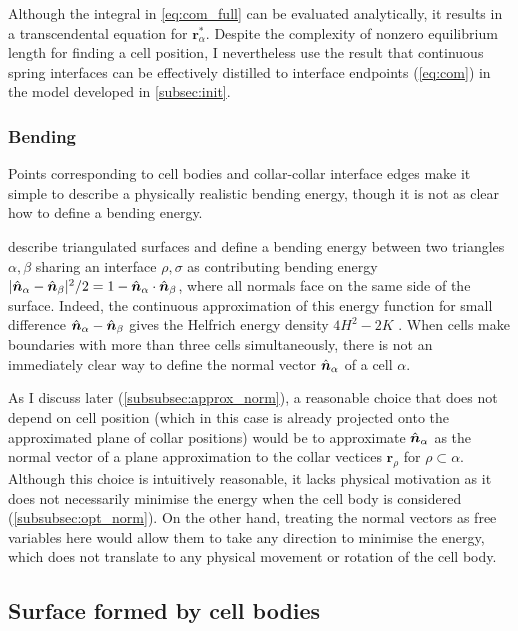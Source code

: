 Although the integral in \cref{eq:com_full} can be evaluated analytically, it results in a transcendental equation for $\bm{r}_\alpha^*$. 
Despite the complexity of nonzero equilibrium length for finding a cell position, I nevertheless use the result that continuous spring interfaces can be effectively distilled to interface endpoints (\cref{eq:com}) in the model developed in \cref{subsec:init}.

\subsubsection{Bending} \label{subsubsec:bending}

Points corresponding to cell bodies and collar-collar interface edges make it simple to describe a physically realistic bending energy, though it is not as clear how to define a bending energy.

\citet{seung1988} describe triangulated surfaces and define a bending energy between two triangles $\alpha,\beta$ sharing an interface $\rho, \sigma$ as contributing bending energy $|\hat{\bm{n}}_\alpha - \hat{\bm{n}}_\beta|^2/2 = 1 - \hat{\bm{n}}_\alpha \cdot \hat{\bm{n}}_\beta$, where all normals face on the same side of the surface. 
Indeed, the continuous approximation of this energy function for small difference $\hat{\bm{n}}_\alpha - \hat{\bm{n}}_\beta$ gives the Helfrich energy density $4H^2 - 2K$ \citep{helfrich1973}. 
When cells make boundaries with more than three cells simultaneously, there is not an immediately clear way to define the normal vector $\hat{\bm{n}}_\alpha$ of a cell $\alpha$. 

As I discuss later (\cref{subsubsec:approx_norm}), a reasonable choice that does not depend on cell position (which in this case is already projected onto the approximated plane of collar positions) would be to approximate $\hat{\bm{n}}_\alpha$ as the normal vector of a plane approximation to the collar vectices $\bm{r}_\rho$ for $\rho\subset\alpha$. 
Although this choice is intuitively reasonable, it lacks physical motivation as it does not necessarily minimise the energy when the cell body is considered (\cref{subsubsec:opt_norm}).
On the other hand, treating the normal vectors as free variables here would allow them to take any direction to minimise the energy, which does not translate to any physical movement or rotation of the cell body. 

\subsection{Surface formed by cell bodies}

